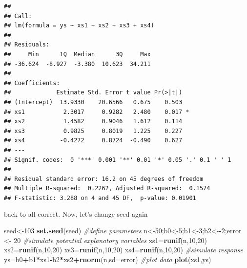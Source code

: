 \documentclass[
]{book}
\newenvironment{Shaded}{\begin{snugshade}}{\end{snugshade}}
\newcommand{\AttributeTok}[1]{\textcolor[rgb]{0.13,0.29,0.53}{#1}}
\newcommand{\CommentTok}[1]{\textcolor[rgb]{0.56,0.35,0.01}{\textit{#1}}}
\newcommand{\DecValTok}[1]{\textcolor[rgb]{0.00,0.00,0.81}{#1}}
\newcommand{\FunctionTok}[1]{\textcolor[rgb]{0.13,0.29,0.53}{\textbf{#1}}}
\newcommand{\NormalTok}[1]{#1}
\newcommand{\OtherTok}[1]{\textcolor[rgb]{0.56,0.35,0.01}{#1}}
\newcommand{\SpecialCharTok}[1]{\textcolor[rgb]{0.81,0.36,0.00}{\textbf{#1}}}
\begin{document}
\begin{verbatim}
## 
## Call:
## lm(formula = ys ~ xs1 + xs2 + xs3 + xs4)
## 
## Residuals:
##     Min      1Q  Median      3Q     Max 
## -36.624  -8.927  -3.380  10.623  34.211 
## 
## Coefficients:
##             Estimate Std. Error t value Pr(>|t|)  
## (Intercept)  13.9330    20.6566   0.675    0.503  
## xs1           2.3017     0.9282   2.480    0.017 *
## xs2           1.4582     0.9046   1.612    0.114  
## xs3           0.9825     0.8019   1.225    0.227  
## xs4          -0.4272     0.8724  -0.490    0.627  
## ---
## Signif. codes:  0 '***' 0.001 '**' 0.01 '*' 0.05 '.' 0.1 ' ' 1
## 
## Residual standard error: 16.2 on 45 degrees of freedom
## Multiple R-squared:  0.2262, Adjusted R-squared:  0.1574 
## F-statistic: 3.288 on 4 and 45 DF,  p-value: 0.01901
\end{verbatim}

back to all correct. Now, let's change seed again

\begin{Shaded}
\begin{Highlighting}[]
\NormalTok{seed}\OtherTok{\textless{}{-}}\DecValTok{103}
\FunctionTok{set.seed}\NormalTok{(seed)}
\CommentTok{\#define parameters}
\NormalTok{n}\OtherTok{\textless{}{-}}\DecValTok{50}\NormalTok{;b0}\OtherTok{\textless{}{-}}\DecValTok{5}\NormalTok{;b1}\OtherTok{\textless{}{-}}\DecValTok{3}\NormalTok{;b2}\OtherTok{\textless{}{-}}\SpecialCharTok{{-}}\DecValTok{2}\NormalTok{;error }\OtherTok{\textless{}{-}} \DecValTok{20}
\CommentTok{\#simulate potential explanatory variables}
\NormalTok{xs1}\OtherTok{=}\FunctionTok{runif}\NormalTok{(n,}\DecValTok{10}\NormalTok{,}\DecValTok{20}\NormalTok{)}
\NormalTok{xs2}\OtherTok{=}\FunctionTok{runif}\NormalTok{(n,}\DecValTok{10}\NormalTok{,}\DecValTok{20}\NormalTok{)}
\NormalTok{xs3}\OtherTok{=}\FunctionTok{runif}\NormalTok{(n,}\DecValTok{10}\NormalTok{,}\DecValTok{20}\NormalTok{)}
\NormalTok{xs4}\OtherTok{=}\FunctionTok{runif}\NormalTok{(n,}\DecValTok{10}\NormalTok{,}\DecValTok{20}\NormalTok{)}
\CommentTok{\#simulate response}
\NormalTok{ys}\OtherTok{=}\NormalTok{b0}\SpecialCharTok{+}\NormalTok{b1}\SpecialCharTok{*}\NormalTok{xs1}\SpecialCharTok{{-}}\NormalTok{b2}\SpecialCharTok{*}\NormalTok{xs2}\SpecialCharTok{+}\FunctionTok{rnorm}\NormalTok{(n,}\AttributeTok{sd=}\NormalTok{error)}
\CommentTok{\#plot data}
\FunctionTok{plot}\NormalTok{(xs1,ys)}
\end{Highlighting}
\end{Shaded}
\end{document}
